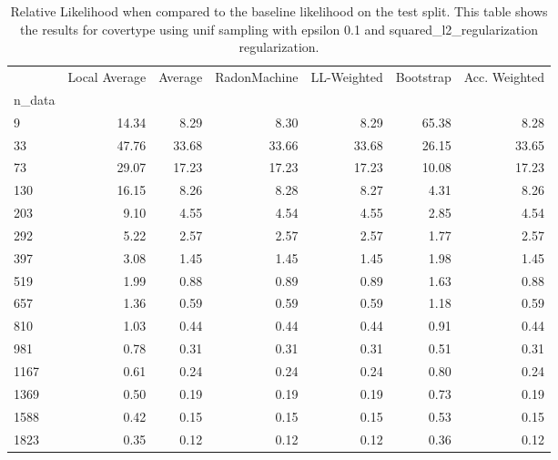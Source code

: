 \begin{table}
\centering
\caption{Relative Likelihood when compared to the baseline likelihood on the test split. This table shows the results for  covertype using  unif sampling with epsilon  0.1 and  squared_l2_regularization regularization.}
\label{tab:12}
\begin{tabular}{lrrrrrr}
\toprule
{} &  Local Average &  Average &  RadonMachine &  LL-Weighted &  Bootstrap &  Acc. Weighted \\
n\_data &                &          &               &              &            &                \\
\midrule
9      &          14.34 &     8.29 &          8.30 &         8.29 &      65.38 &           8.28 \\
33     &          47.76 &    33.68 &         33.66 &        33.68 &      26.15 &          33.65 \\
73     &          29.07 &    17.23 &         17.23 &        17.23 &      10.08 &          17.23 \\
130    &          16.15 &     8.26 &          8.28 &         8.27 &       4.31 &           8.26 \\
203    &           9.10 &     4.55 &          4.54 &         4.55 &       2.85 &           4.54 \\
292    &           5.22 &     2.57 &          2.57 &         2.57 &       1.77 &           2.57 \\
397    &           3.08 &     1.45 &          1.45 &         1.45 &       1.98 &           1.45 \\
519    &           1.99 &     0.88 &          0.89 &         0.89 &       1.63 &           0.88 \\
657    &           1.36 &     0.59 &          0.59 &         0.59 &       1.18 &           0.59 \\
810    &           1.03 &     0.44 &          0.44 &         0.44 &       0.91 &           0.44 \\
981    &           0.78 &     0.31 &          0.31 &         0.31 &       0.51 &           0.31 \\
1167   &           0.61 &     0.24 &          0.24 &         0.24 &       0.80 &           0.24 \\
1369   &           0.50 &     0.19 &          0.19 &         0.19 &       0.73 &           0.19 \\
1588   &           0.42 &     0.15 &          0.15 &         0.15 &       0.53 &           0.15 \\
1823   &           0.35 &     0.12 &          0.12 &         0.12 &       0.36 &           0.12 \\
\bottomrule
\end{tabular}
\end{table}
